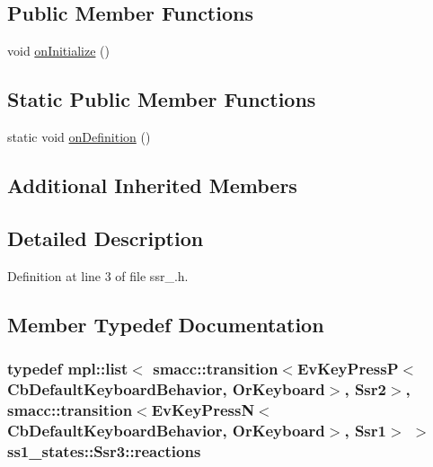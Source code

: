 \subsection*{Public Member Functions}
\begin{DoxyCompactItemize}
\item 
void \hyperlink{structss1__states_1_1Ssr3_a03b2ca6ace5da4ed6a81986586be4197}{on\+Initialize} ()
\end{DoxyCompactItemize}
\subsection*{Static Public Member Functions}
\begin{DoxyCompactItemize}
\item 
static void \hyperlink{structss1__states_1_1Ssr3_ab4080e0b854ed436d8fb1009a8983ab3}{on\+Definition} ()
\end{DoxyCompactItemize}
\subsection*{Additional Inherited Members}


\subsection{Detailed Description}


Definition at line 3 of file ssr\+\_.\+h.



\subsection{Member Typedef Documentation}
\subsubsection[{\texorpdfstring{reactions}{reactions}}]{\setlength{\rightskip}{0pt plus 5cm}typedef mpl\+::list$<$ {\bf smacc\+::transition}$<$Ev\+Key\+PressP$<$Cb\+Default\+Keyboard\+Behavior, Or\+Keyboard$>$, {\bf Ssr2}$>$, {\bf smacc\+::transition}$<$Ev\+Key\+PressN$<$Cb\+Default\+Keyboard\+Behavior, Or\+Keyboard$>$, {\bf Ssr1}$>$ $>$ {\bf ss1\+\_\+states\+::\+Ssr3\+::reactions}}\hypertarget{structss1__states_1_1Ssr3_a6bf2881b46152e751f7807392b31fa74}{}\label{structss1__states_1_1Ssr3_a6bf2881b46152e751f7807392b31fa74}


